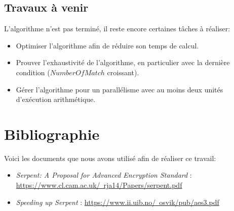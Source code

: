 \documentclass{article}
\begin{document}
\subsection{Travaux à venir}
L'algorithme n'est pas terminé, il reste encore certaines tâches à réaliser:

\begin{itemize}
\item Optimiser l'algorithme afin de réduire son temps de calcul.
\item Prouver l'exhaustivité de l'algorithme, en particulier avec la dernière condition ($NumberOfMatch$ croissant).
\item Gérer l'algorithme pour un parallélisme avec au moins deux unités d'exécution arithmétique.
\end{itemize}
\section{Bibliographie}

Voici les documents que nous avons utilisé afin de réaliser ce travail:

\medbreak
\begin{itemize}
\item \textit{Serpent: A Proposal for Advanced Encryption Standard} : \underline{https://www.cl.cam.ac.uk/~rja14/Papers/serpent.pdf}
\medbreak

\item \textit{Speeding up Serpent} : \underline{https://www.ii.uib.no/~osvik/pub/aes3.pdf}
\end{itemize}
\end{document}
